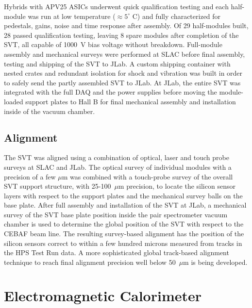 \documentclass[final,3p,times,twocolumn]{elsarticle}
\begin{document}
Hybrids with APV25 ASICs underwent quick qualification testing and each half-module was run at low 
temperature ($\approx5^{\circ}$ C) and fully characterized for pedestals, gains, noise and time response 
after assembly.  Of 29 half-modules built, 28 passed qualification testing, leaving 8 spare modules after 
completion of the SVT, all capable of 1000~V bias voltage without breakdown.  Full-module assembly 
and mechanical surveys were performed at SLAC before final assembly, testing and shipping of the 
SVT to JLab. A custom shipping container with nested crates and redundant isolation for shock and 
vibration was built in order to safely send the partly assembled SVT to JLab. At JLab, the entire SVT was 
integrated with the full DAQ and the power supplies before moving the module-loaded support plates to 
Hall B for final mechanical assembly and installation inside of the vacuum chamber.

\subsection{Alignment}
The SVT was aligned using a combination of optical, laser and touch probe surveys at SLAC and JLab. 
The optical survey of individual modules with a precision of a few $\mu$m was combined with a 
touch-probe survey of the overall SVT support structure, with 25-100~$\mu$m precision, to locate the 
silicon sensor layers with respect to the support plates and the mechanical survey balls on the base 
plate. After full assembly and installation of the SVT at JLab, a mechanical survey of the SVT base plate 
position inside the pair spectrometer vacuum chamber is used to determine the global position of the 
SVT with respect to the CEBAF beam line. The resulting survey-based alignment has the position of the 
silicon sensors correct to within a few hundred microns measured from tracks in the HPS Test Run 
data. A more sophisticated global track-based alignment technique to reach final alignment precision 
well below 50~$\mu$m is being developed.




\section{Electromagnetic Calorimeter}
\label{sec:ecal}
\end{document}
